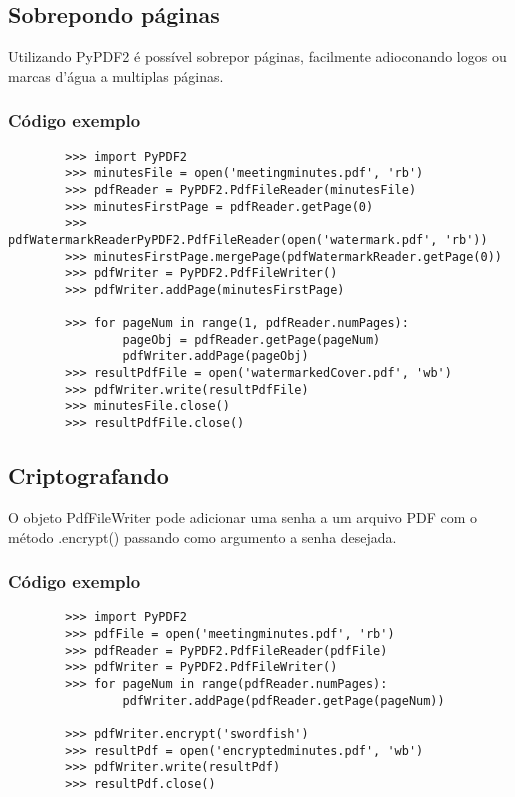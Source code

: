 \documentclass[12pt,a4paper,article]{report}
\begin{document}
    
\subsection{Sobrepondo páginas}
    Utilizando PyPDF2 é possível sobrepor páginas, facilmente adioconando logos ou marcas d'água a multiplas páginas.

\subsubsection{Código exemplo}
    \begin{verbatim}
        >>> import PyPDF2 
        >>> minutesFile = open('meetingminutes.pdf', 'rb') 
        >>> pdfReader = PyPDF2.PdfFileReader(minutesFile) 
        >>> minutesFirstPage = pdfReader.getPage(0) 
        >>> pdfWatermarkReaderPyPDF2.PdfFileReader(open('watermark.pdf', 'rb')) 
        >>> minutesFirstPage.mergePage(pdfWatermarkReader.getPage(0)) 
        >>> pdfWriter = PyPDF2.PdfFileWriter() 
        >>> pdfWriter.addPage(minutesFirstPage)

        >>> for pageNum in range(1, pdfReader.numPages):
                pageObj = pdfReader.getPage(pageNum)
                pdfWriter.addPage(pageObj)
        >>> resultPdfFile = open('watermarkedCover.pdf', 'wb')
        >>> pdfWriter.write(resultPdfFile) 
        >>> minutesFile.close() 
        >>> resultPdfFile.close()
    \end{verbatim}
    
\subsection{Criptografando}
    O objeto PdfFileWriter pode adicionar uma senha a um arquivo PDF com o método .encrypt() passando como argumento a senha desejada.

\subsubsection{Código exemplo}
    \begin{verbatim}
        >>> import PyPDF2 
        >>> pdfFile = open('meetingminutes.pdf', 'rb') 
        >>> pdfReader = PyPDF2.PdfFileReader(pdfFile) 
        >>> pdfWriter = PyPDF2.PdfFileWriter() 
        >>> for pageNum in range(pdfReader.numPages):
                pdfWriter.addPage(pdfReader.getPage(pageNum))

        >>> pdfWriter.encrypt('swordfish') 
        >>> resultPdf = open('encryptedminutes.pdf', 'wb') 
        >>> pdfWriter.write(resultPdf) 
        >>> resultPdf.close()
    \end{verbatim}
    
\end{document}
